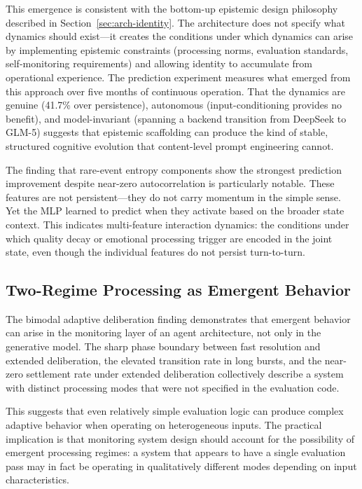 \documentclass[twoside,11pt]{article}
\begin{document}
This emergence is consistent with the bottom-up epistemic design philosophy
described in Section~\ref{sec:arch-identity}. The architecture does not specify
what dynamics should exist---it creates the conditions under which dynamics can
arise by implementing epistemic constraints (processing norms, evaluation
standards, self-monitoring requirements) and allowing identity to accumulate
from operational experience. The prediction experiment measures what emerged
from this approach over five months of continuous operation. That the dynamics
are genuine (41.7\% over persistence), autonomous (input-conditioning provides
no benefit), and model-invariant (spanning a backend transition from DeepSeek to
GLM-5) suggests that epistemic scaffolding can produce the kind of stable,
structured cognitive evolution that content-level prompt engineering cannot.

The finding that rare-event entropy components show the strongest prediction
improvement despite near-zero autocorrelation is particularly notable. These
features are not persistent---they do not carry momentum in the simple sense.
Yet the MLP learned to predict when they activate based on the broader state
context. This indicates multi-feature interaction dynamics: the conditions under
which quality decay or emotional processing trigger are encoded in the joint
state, even though the individual features do not persist turn-to-turn.

\subsection{Two-Regime Processing as Emergent Behavior}
\label{sec:discuss-bimodal}

The bimodal adaptive deliberation finding demonstrates that emergent behavior
can arise in the monitoring layer of an agent architecture, not only in the
generative model. The sharp phase boundary between fast resolution and extended
deliberation, the elevated transition rate in long bursts, and the near-zero
settlement rate under extended deliberation collectively describe a system with
distinct processing modes that were not specified in the evaluation code.

This suggests that even relatively simple evaluation logic can produce complex
adaptive behavior when operating on heterogeneous inputs. The practical
implication is that monitoring system design should account for the possibility
of emergent processing regimes: a system that appears to have a single
evaluation pass may in fact be operating in qualitatively different modes
depending on input characteristics.
\end{document}
